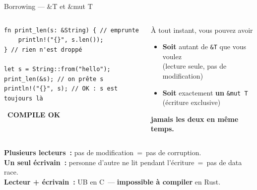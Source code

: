 \documentclass[aspectratio=169, 10pt]{beamer}
\newcommand{\rust}[1]{\texttt{#1}}
\newcommand{\compilerok}{{\color{SafeGreen}\faCheckCircle\ \textbf{COMPILE OK}}}
\begin{document}
\begin{frame}[fragile]{Borrowing --- \&T et \&mut T}
  \begin{columns}[t]
    \begin{tcolorbox}[safebox, title={\faRust\ Référence immuable \texttt{\&T}}]
      \begin{verbatim}
fn print_len(s: &String) { // emprunte
    println!("{}", s.len());
} // rien n'est droppé

let s = String::from("hello");
print_len(&s); // on prête s
println!("{}", s); // OK : s est toujours là
      \end{verbatim}
    \compilerok
    \end{tcolorbox}

    \begin{tcolorbox}[rulebox, title={\faBook\ Règles du Borrow Checker}]
      \small À tout instant, vous pouvez avoir
      \begin{itemize}
        \item \textbf{Soit} autant de \rust{&T} que vous voulez\\{\tiny (lecture seule, pas de modification)}
        \item \textbf{Soit} exactement \textbf{un} \rust{&mut T}\\{\tiny (écriture exclusive)}
      \end{itemize}
      \textbf{jamais les deux en même temps.}
    \end{tcolorbox}
  \end{columns}
  \begin{tcolorbox}[notebox, title={\faLightbulb\ Pourquoi~?}]
    \small \textbf{Plusieurs lecteurs~:} pas de modification~=~pas de corruption.\\
    \textbf{Un seul écrivain~:} personne d'autre ne lit pendant l'écriture~=~pas de data race.\\
    \textbf{Lecteur + écrivain~:} UB en C~--- \textbf{impossible à compiler} en Rust.
  \end{tcolorbox}
\end{frame}
\end{document}

